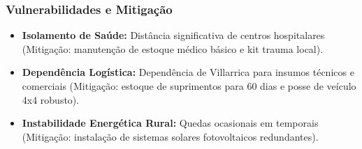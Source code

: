 \subsubsection{Vulnerabilidades e
Mitigação}

\begin{itemize}
\tightlist
\item
  \textbf{Isolamento de Saúde:} Distância significativa de centros
  hospitalares (Mitigação: manutenção de estoque médico básico e kit
  trauma local).
\item
  \textbf{Dependência Logística:} Dependência de Villarrica para insumos
  técnicos e comerciais (Mitigação: estoque de suprimentos para 60 dias
  e posse de veículo 4x4 robusto).
\item
  \textbf{Instabilidade Energética Rural:} Quedas ocasionais em
  temporais (Mitigação: instalação de sistemas solares fotovoltaicos
  redundantes).
\end{itemize}

